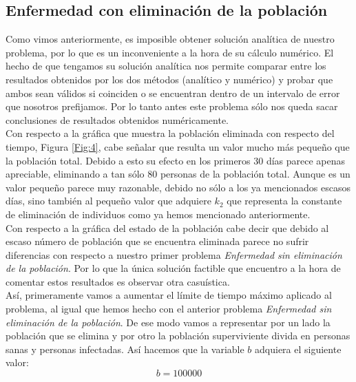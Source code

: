 \documentclass[a4paper,11pt]{article}
\numberwithin{equation}{section}
\begin{document}
\subsection{Enfermedad con eliminación de la población}
\indent Como vimos anteriormente, es imposible obtener solución analítica de nuestro problema, por lo que es un inconveniente a la hora de su cálculo numérico. El hecho de que tengamos su solución analítica nos permite comparar entre los resultados obtenidos por los dos métodos (analítico y numérico) y probar que ambos sean válidos si coinciden o se encuentran dentro de un intervalo de error que nosotros prefijamos. Por lo tanto antes este problema sólo nos queda sacar conclusiones de resultados obtenidos numéricamente. \\

\indent Con respecto a la gráfica que muestra la población eliminada con respecto del tiempo, Figura \ref{Fig:4}, cabe señalar que resulta un valor mucho más pequeño que la población total. Debido a esto su efecto en los primeros 30 días parece apenas apreciable, eliminando a tan sólo 80 personas de la población total. Aunque es un valor pequeño parece muy razonable, debido no sólo a los ya mencionados escasos días, sino también al pequeño valor que adquiere $ k_2 $ que representa la constante de eliminación de individuos como ya hemos mencionado anteriormente. \\

\indent Con respecto a la gráfica del estado de la población cabe decir que debido al escaso número de población que se encuentra eliminada parece no sufrir diferencias con respecto a nuestro primer problema \textit{Enfermedad sin eliminación de la población}. Por lo que la única solución factible que encuentro a la hora de comentar estos resultados es observar otra casuística. \\

\indent Así, primeramente vamos a aumentar el límite de tiempo máximo aplicado al problema, al igual que hemos hecho con el anterior problema \textit{Enfermedad sin eliminación de la población}. De ese modo vamos a representar por un lado la población que se elimina y por otro la población superviviente divida en personas sanas y personas infectadas. Así hacemos que la variable $ b $ adquiera el siguiente valor:
\begin{equation}
b=100000
\end{equation}
\end{document}
